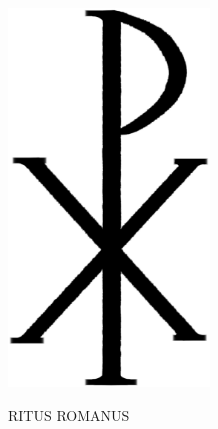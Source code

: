\begin{titlepage}
    \centering
    \flushbottom
    \vspace*{-2em}


    {\romanfont\fontsize{60}{60}\selectfont\MakeUppercase{\thetitle}}



    \includegraphics[width=0.4\textwidth]{img/chi_rho.png}
    \vspace{-0.5em}



    {\romanfont\fontsize{32}{32}\selectfont\uppercase{Ritus Romanus}}
    \\[2\baselineskip]

    {\Large\MakeUppercase{\romannumeral\thedate}}
    \\[\baselineskip]

\end{titlepage}
\restoregeometry
